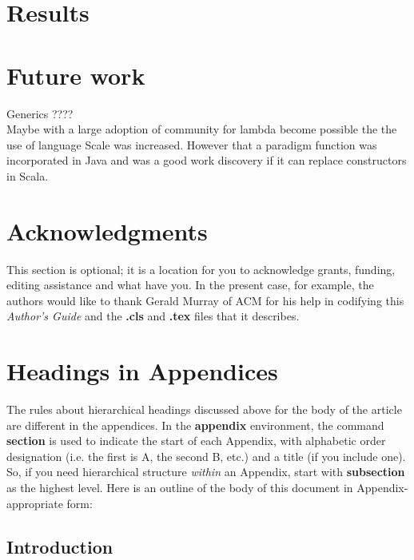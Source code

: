 \documentclass{sig-alternate-05-2015}
\begin{document}
\section{Results}

\section{Future work}
Generics ????\\
Maybe with a large adoption of community for lambda become possible the the use of language Scale was increased. However that a paradigm function was incorporated in Java and was a good work discovery if it can replace constructors in Scala.



\section{Acknowledgments}
This section is optional; it is a location for you
to acknowledge grants, funding, editing assistance and
what have you.  In the present case, for example, the
authors would like to thank Gerald Murray of ACM for
his help in codifying this \textit{Author's Guide}
and the \textbf{.cls} and \textbf{.tex} files that it describes.

%

%
%
\appendix
\section{Headings in Appendices}
The rules about hierarchical headings discussed above for
the body of the article are different in the appendices.
In the \textbf{appendix} environment, the command
\textbf{section} is used to
indicate the start of each Appendix, with alphabetic order
designation (i.e. the first is A, the second B, etc.) and
a title (if you include one).  So, if you need
hierarchical structure
\textit{within} an Appendix, start with \textbf{subsection} as the
highest level. Here is an outline of the body of this
document in Appendix-appropriate form:
\subsection{Introduction}
\end{document}
